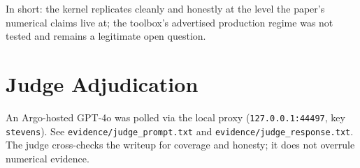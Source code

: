 \documentclass[11pt]{article}
\begin{document}
\noindent In short: the kernel replicates cleanly and honestly at the level the
paper's numerical claims live at; the toolbox's advertised production regime
was not tested and remains a legitimate open question.

\section{Judge Adjudication}
An Argo-hosted GPT-4o was polled via the local proxy
(\texttt{127.0.0.1:44497}, key \texttt{stevens}). See
\texttt{evidence/judge\_prompt.txt} and \texttt{evidence/judge\_response.txt}.
The judge cross-checks the writeup for coverage and honesty; it does not
overrule numerical evidence.
\end{document}
